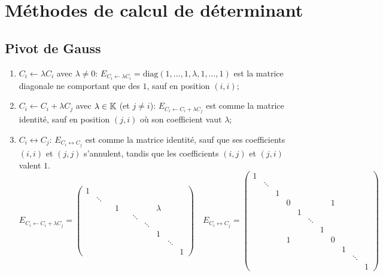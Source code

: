 \documentclass{book}
\begin{document}
\section{Méthodes de calcul de déterminant}
\subsection{Pivot de Gauss}


\begin{Definition}
\begin{enumerate}
  \item $C_i \leftarrow \lambda C_i$ avec $\lambda \neq 0$:
  $E_{C_i \leftarrow \lambda C_i} = \text{diag}(1,\ldots,1,\lambda,1,\ldots,1)$ est la matrice diagonale
  ne comportant que des $1$, sauf en position $(i,i)$;
  \item $C_i \leftarrow C_i+\lambda C_j$ avec $\lambda \in \mathbb{K}$ (et $j\neq i$):
  $E_{C_i \leftarrow C_i+\lambda C_j}$ est comme la matrice identité,
  sauf en position $(j,i)$ où son coefficient vaut $\lambda$;
  \item $C_i \leftrightarrow C_j$: $E_{C_i \leftrightarrow C_j}$ est comme la matrice identité,
  sauf que ses coefficients $(i,i)$ et $(j,j)$ s'annulent, tandis que les coefficients
  $(i,j)$ et $(j,i)$ valent $1$.
\[
E_{C_i \leftarrow C_i+\lambda C_j} = \left( \begin{smallmatrix}
1 \\ & \ddots \\ &&& 1 &&&& \lambda \\ &&&&& \ddots \\&&&&&& \ddots \\
&&&&&&& 1 \\ &&&&&&&& \ddots \\ &&&&&&&&& 1
\end{smallmatrix} \right) \quad
E_{C_i \leftrightarrow C_j} = \left( \begin{smallmatrix}
1 \\ & \ddots \\ && 1 \\ &&& 0 &&&& 1 \\ &&&& 1 \\ &&&&& \ddots \\&&&&&& 1 \\ &&& 1 &&&& 0 \\
&&&&&&&& 1 \\ &&&&&&&&& \ddots \\ &&&&&&&&&& 1
\end{smallmatrix} \right)
\]
\end{enumerate}
\end{Definition}
\end{document}
